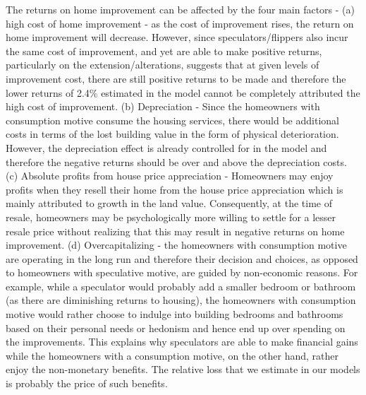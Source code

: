 \documentclass[AEJ,reqno, draftmode]{AEA} %
\begin{document}
The returns on home improvement can be affected by the four main factors - (a) high cost of home improvement - as the cost of improvement rises, the return on home improvement will decrease. However, since speculators/flippers also incur the same cost of improvement, and yet are able to make positive returns, particularly on the extension/alterations, suggests that at given levels of improvement cost, there are still positive returns to be made and therefore the lower returns of 2.4\% estimated in the model cannot be completely attributed the high cost of improvement. (b) Depreciation - Since the homeowners with consumption motive consume the housing services, there would be additional costs in terms of the lost building value in the form of physical deterioration. However, the depreciation effect is already controlled for in the model and therefore the negative returns should be over and above the depreciation costs. (c) Absolute profits from house price appreciation - Homeowners may enjoy profits when they resell their home from the house price appreciation which is mainly attributed to growth in the land value. Consequently, at the time of resale, homeowners may be psychologically more willing to settle for a lesser resale price without realizing that this may result in negative returns on home improvement. (d) Overcapitalizing - the homeowners with consumption motive are operating in the long run and therefore their decision and choices, as opposed to homeowners with speculative motive, are guided by non-economic reasons. For example, while a speculator would probably add a smaller bedroom or bathroom (as there are diminishing returns to housing), the homeowners with consumption motive would rather choose to indulge into building bedrooms and bathrooms based on their personal needs or hedonism and hence end up over spending on the improvements. This explains why speculators are able to make financial gains while the homeowners with a consumption motive, on the other hand, rather enjoy the non-monetary benefits. The relative loss that we estimate in our models is probably the price of such benefits. %





\end{document}

